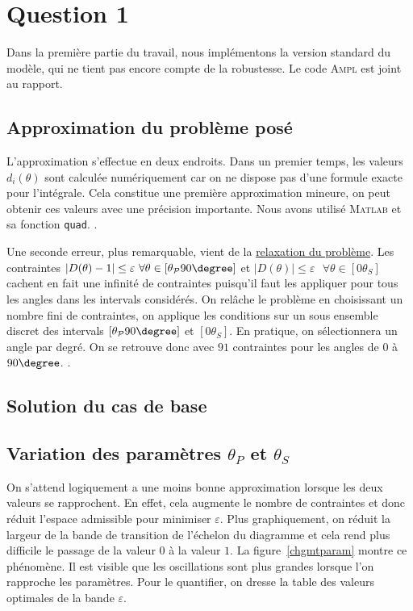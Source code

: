 \section*{Question 1}
 
 Dans la première partie du travail, nous implémentons la version standard du modèle, qui ne tient pas encore compte de la robustesse. Le code \textsc{Ampl} est joint au rapport. 
 
 
 
 
 \subsection*{Approximation du problème posé}
L'approximation s'effectue en deux endroits. Dans un premier temps, les valeurs $d_{i}(\theta)$ sont calculée numériquement car on ne dispose pas d'une formule exacte pour l'intégrale. Cela constitue une première approximation mineure, on peut obtenir ces valeurs avec une précision importante. Nous avons utilisé \textsc{Matlab} et sa fonction \texttt{quad}. .

Une seconde erreur, plus remarquable, vient de la \underline{relaxation du problème}. 
Les contraintes $|D(\theta)-1| \leq \varepsilon\text{ } \forall \theta\in [\theta_{\mathcal{P}} 90\degree]$ et $|D(\theta)| \leq \varepsilon\text{ } \forall \theta\in [0 \theta_{S}]$ cachent en fait une infinité de contraintes puisqu'il faut les appliquer pour tous les angles dans les intervals considérés.
On relâche le problème en choisissant un nombre fini de contraintes, on applique les conditions sur un sous ensemble discret des intervals $[\theta_{\mathcal{P}} 90\degree]$ et $[0 \theta_{S}]$. En pratique, on sélectionnera un angle par degré. On se retrouve donc avec $91$ contraintes pour les angles de $0$ à $90\degree$. .

\subsection*{Solution du cas de base}


\subsection*{Variation des paramètres $\theta_{P}$ et $\theta_{S}$}
On s'attend logiquement a une moins bonne approximation lorsque les deux valeurs se rapprochent. En effet, cela augmente le nombre de contraintes et donc réduit l'espace admissible pour minimiser $\varepsilon$. Plus graphiquement, on réduit la largeur de la bande de transition de l'échelon du diagramme et cela rend plus difficile le passage de la valeur $0$ à la valeur $1$. La figure~\ref{chgmtparam} montre ce phénomène. Il est visible que les oscillations sont plus grandes lorsque l'on rapproche les paramètres. Pour le quantifier, on dresse la table des valeurs optimales de la bande $\varepsilon$.

